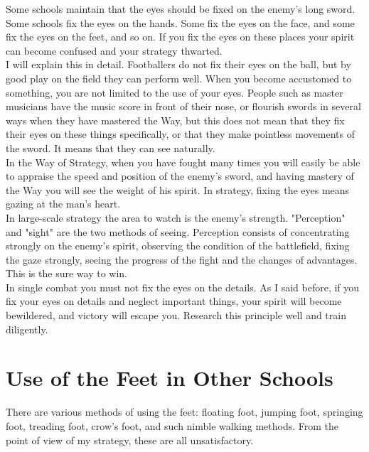 Some schools maintain that the eyes should be fixed on the enemy's long sword. Some schools fix the eyes on the hands. Some fix the eyes on the face, and some fix the eyes on the feet, and so on. If you fix the eyes on these places your spirit can become confused and your strategy thwarted.\\

I will explain this in detail. Footballers do not fix their eyes on the ball, but by good play on the field they can perform well. When you become accustomed to something, you are not limited to the use of your eyes. People such as master musicians have the music score in front of their nose, or flourish swords in several ways when they have mastered the Way, but this does not mean that they fix their eyes on these things specifically, or that they make pointless movements of the sword. It means that they can see naturally.\\

In the Way of Strategy, when you have fought many times you will easily be able to appraise the speed and position of the enemy's sword, and having mastery of the Way you will see the weight of his spirit. In strategy, fixing the eyes means gazing at the man's heart.\\

In large-scale strategy the area to watch is the enemy's strength. "Perception" and "sight" are the two methods of seeing. Perception consists of concentrating strongly on the enemy's spirit, observing the condition of the battlefield, fixing the gaze strongly, seeing the progress of the fight and the changes of advantages. This is the sure way to win.\\

In single combat you must not fix the eyes on the details. As I said before, if you fix your eyes on details and neglect important things, your spirit will become bewildered, and victory will escape you. Research this principle well and train diligently.\\
\section{Use of the Feet in Other Schools}

There are various methods of using the feet: floating foot, jumping foot, springing foot, treading foot, crow's foot, and such nimble walking methods. From the point of view of my strategy, these are all unsatisfactory.\\

